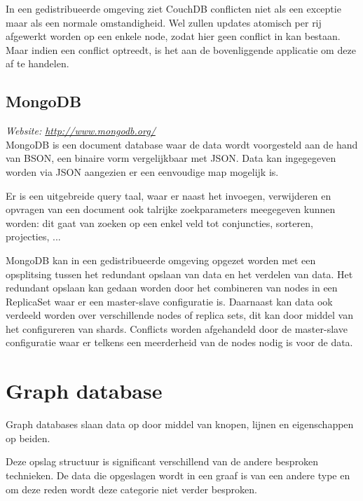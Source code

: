 In een gedistribueerde omgeving ziet CouchDB conflicten niet als een exceptie maar als een normale omstandigheid. Wel zullen updates atomisch per rij afgewerkt worden op een enkele node, zodat hier geen conflict in kan bestaan. Maar indien een conflict optreedt, is het aan de bovenliggende applicatie om deze af te handelen. 


\subsection{MongoDB}
\textit{Website: \url{http://www.mongodb.org/}}\\
MongoDB is een document database waar de data wordt voorgesteld aan de hand van BSON, een binaire vorm vergelijkbaar met JSON. Data kan ingegegeven worden via JSON aangezien er een eenvoudige map mogelijk is. 

Er is een uitgebreide query taal, waar er naast het invoegen, verwijderen en opvragen van een document ook talrijke zoekparameters meegegeven kunnen worden: dit gaat van zoeken op een enkel veld tot conjuncties, sorteren, projecties, ... 

MongoDB kan in een gedistribueerde omgeving opgezet worden met een opsplitsing tussen het redundant opslaan van data en het verdelen van data. Het redundant opslaan kan gedaan worden door het combineren van nodes in een ReplicaSet waar er een master-slave configuratie is. Daarnaast kan data ook verdeeld worden over verschillende nodes of replica sets, dit kan door middel van het configureren van shards. 
Conflicts worden afgehandeld door de master-slave configuratie waar er telkens een meerderheid van de nodes nodig is voor de data. 

\section{Graph database}
Graph databases slaan data op door middel van knopen, lijnen en eigenschappen op beiden. 

Deze opslag structuur is significant verschillend van de andere besproken technieken. De data die opgeslagen wordt in een graaf is van een andere type en om deze reden wordt deze categorie niet verder besproken. 
 

